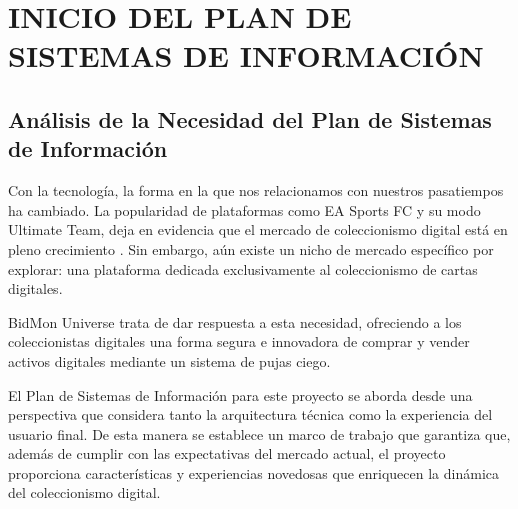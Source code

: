 
\section{INICIO DEL PLAN DE SISTEMAS DE INFORMACIÓN}
\subsection{Análisis de la Necesidad del Plan de Sistemas de Información}
Con la tecnología, la forma en la que nos relacionamos con nuestros pasatiempos ha cambiado. La popularidad de plataformas como EA Sports FC y su modo Ultimate Team\cite{artsEASPORTSFC2023}, deja en evidencia que el mercado de coleccionismo digital está en pleno crecimiento \cite{sanmartin000MillonesDolares2021}. Sin embargo, aún existe un nicho de mercado específico por explorar: una plataforma dedicada exclusivamente al coleccionismo de cartas digitales.

BidMon Universe trata de dar respuesta a esta necesidad, ofreciendo a los coleccionistas digitales una forma segura e innovadora de comprar y vender activos digitales mediante un sistema de pujas ciego.

El Plan de Sistemas de Información para este proyecto se aborda desde una perspectiva que considera tanto la arquitectura técnica como la experiencia del usuario final. De esta manera se establece un marco de trabajo que garantiza que, además de cumplir con las expectativas del mercado actual, el proyecto proporciona características y experiencias novedosas que enriquecen la dinámica del coleccionismo digital.

